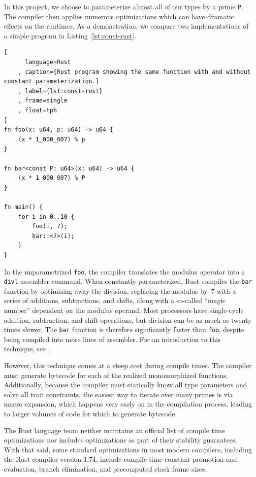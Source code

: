 \documentclass{article}
\theoremstyle{definition}
\theoremstyle{remark}
\begin{document}
In this project, we choose to parameterize almost all of our types by a prime \texttt{P}.
The compiler then applies numerous optimizations which can have dramatic effects on the runtimes.
As a demonstration, we compare two implementations of a simple program in Listing~\ref{lst:const-rust}.

\begin{lstlisting}[
      language=Rust
    , caption={Rust program showing the same function with and without constant parameterization.}
    , label={lst:const-rust}
    , frame=single
    , float=tph
]
fn foo(x: u64, p: u64) -> u64 {
    (x * 1_000_007) % p
}

fn bar<const P: u64>(x: u64) -> u64 {
    (x * 1_000_007) % P
}

fn main() {
    for i in 0..10 {
        foo(i, 7);
        bar::<7>(i);
    }
}
\end{lstlisting}%

In the unparametrized \texttt{foo}, the compiler translates the modulus operator into a \texttt{divl} assembler command.
When constantly parameterized, Rust compiles the \texttt{bar} function by optimizing away the division, replacing the modulus by~$7$ with a series of additions, subtractions, and shifts, along with a so-called ``magic number'' dependent on the modulus operand.
Most processors have single-cycle addition, subtraction, and shift operations, but division can be as much as twenty times slower.
The \texttt{bar} function is therefore significantly faster than \texttt{foo}, despite being compiled into more lines of assembler.
For an introduction to this technique, see~\cite[Chapter~10]{hackers-delight}.

However, this technique comes at a steep cost during compile times.
The compiler must generate bytecode for each of the realized monomorphized functions.
Additionally, because the compiler must statically know all type parameters and solve all trait constraints, the easiest way to iterate over many primes is via macro expansion, which happens very early on in the compilation process, leading to larger volumes of code for which to generate bytecode.

The Rust language team neither maintains an official list of compile time optimizations nor includes optimizations as part of their stability guarantees.
With that said, some standard optimizations in most modern compilers, including the Rust compiler version 1.74, include compile-time constant promotion and evaluation, branch elimination, and precomputed stack frame sizes.
\end{document}
